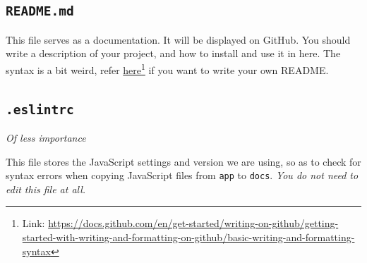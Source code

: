 \subsection{\texttt{README.md}}
\label{sec:readme}

This file serves as a documentation. It will be displayed on GitHub. You should write a description of your project, and how to install and use it in here. The syntax is a bit weird, refer \href{https://docs.github.com/en/get-started/writing-on-github/getting-started-with-writing-and-formatting-on-github/basic-writing-and-formatting-syntax}{here}\footnote{Link: \url{https://docs.github.com/en/get-started/writing-on-github/getting-started-with-writing-and-formatting-on-github/basic-writing-and-formatting-syntax}} if you want to write your own README.

\subsection{\texttt{.eslintrc}}

\textit{Of less importance}

This file stores the JavaScript settings and version we are using, so as to check for syntax errors when copying JavaScript files from \texttt{app} to \texttt{docs}. \textit{You do not need to edit this file at all.}